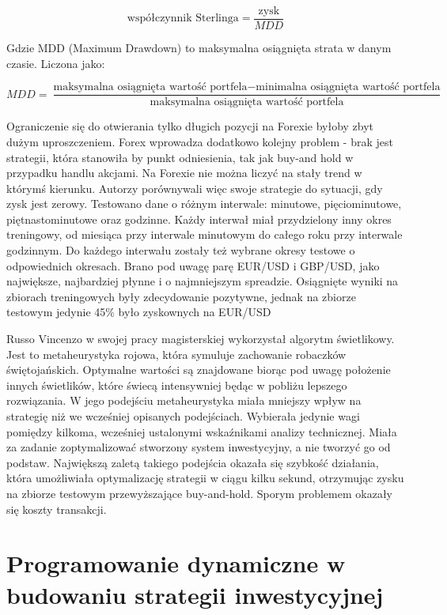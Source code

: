 \documentclass[twoside]{iisthesis}
\begin{document}
\[\text{współczynnik Sterlinga}=\frac{\text{zysk}}{MDD}\]

Gdzie MDD (Maximum Drawdown) to maksymalna osiągnięta strata w danym czasie. Liczona jako:

\[MDD=\frac{\text{maksymalna osiągnięta wartość portfela} - \text{minimalna osiągnięta wartość portfela}}{\text{maksymalna osiągnięta wartość portfela}}\]

Ograniczenie się do otwierania tylko długich pozycji na Forexie byłoby zbyt dużym uproszczeniem. Forex wprowadza dodatkowo kolejny problem - brak jest strategii, która stanowiła by punkt odniesienia, tak jak buy-and hold w przypadku handlu akcjami. Na Forexie nie można liczyć na stały trend w którymś kierunku. Autorzy porównywali więc swoje strategie do sytuacji, gdy zysk jest zerowy. Testowano dane o różnym interwale: minutowe, pięciominutowe, piętnastominutowe oraz godzinne. Każdy interwał miał przydzielony inny okres treningowy, od miesiąca przy interwale minutowym do całego roku przy interwale godzinnym. Do każdego interwału zostały też wybrane okresy testowe o odpowiednich okresach. Brano pod uwagę parę EUR/USD i GBP/USD, jako największe, najbardziej płynne i o najmniejszym spreadzie. Osiągnięte wyniki na zbiorach treningowych były zdecydowanie pozytywne, jednak na zbiorze testowym jedynie 45\% było zyskownych na EUR/USD

Russo Vincenzo w swojej pracy magisterskiej \cite{Russo:2015} wykorzystał algorytm świetlikowy. Jest to metaheurystyka rojowa, która symuluje zachowanie robaczków świętojańskich. Optymalne wartości są znajdowane biorąc pod uwagę położenie innych świetlików, które świecą intensywniej będąc w pobliżu lepszego rozwiązania. W jego podejściu metaheurystyka miała mniejszy wpływ na strategię niż we wcześniej opisanych podejściach. Wybierała jedynie wagi pomiędzy kilkoma, wcześniej ustalonymi wskaźnikami analizy technicznej. Miała za zadanie zoptymalizować stworzony system inwestycyjny, a nie tworzyć go od podstaw. Największą zaletą takiego podejścia okazała się szybkość działania, która umożliwiała optymalizację strategii w ciągu kilku sekund, otrzymując zysku na zbiorze testowym przewyższające buy-and-hold. Sporym problemem okazały się koszty transakcji.





\section{Programowanie dynamiczne w budowaniu strategii inwestycyjnej}
\end{document}
